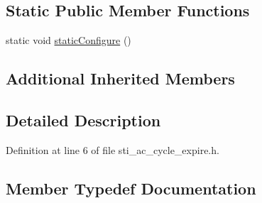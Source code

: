 \subsection*{Static Public Member Functions}
\begin{DoxyCompactItemize}
\item 
static void \hyperlink{structsm__respira__1_1_1ac__cycle__inner__states_1_1StiACCycleExpire_a82bfd9279d2e10b9d9815310fe29e14d}{static\+Configure} ()
\end{DoxyCompactItemize}
\subsection*{Additional Inherited Members}


\subsection{Detailed Description}


Definition at line 6 of file sti\+\_\+ac\+\_\+cycle\+\_\+expire.\+h.



\subsection{Member Typedef Documentation}
\mbox{\label{structsm__respira__1_1_1ac__cycle__inner__states_1_1StiACCycleExpire_aed9b816dca6a2dfa6500c2e4678d3784}} 
